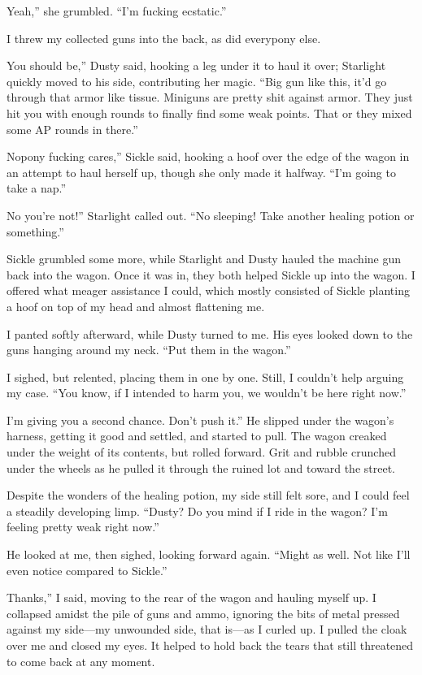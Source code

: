 \leavevmode{}Yeah,” she grumbled. “I’m fucking ecstatic.”

I threw my collected guns into the back, as did everypony else.

\leavevmode{}You should be,” Dusty said, hooking a leg under it to haul it over; Starlight quickly moved to his side, contributing her magic. “Big gun like this, it’d go through that armor like tissue. Miniguns are pretty shit against armor. They just hit you with enough rounds to finally find some weak points. That or they mixed some AP rounds in there.”

\leavevmode{}Nopony fucking cares,” Sickle said, hooking a hoof over the edge of the wagon in an attempt to haul herself up, though she only made it halfway. “I’m going to take a nap.”

\leavevmode{}No you’re not!” Starlight called out. “No sleeping! Take another healing potion or something.”

Sickle grumbled some more, while Starlight and Dusty hauled the machine gun back into the wagon. Once it was in, they both helped Sickle up into the wagon. I offered what meager assistance I could, which mostly consisted of Sickle planting a hoof on top of my head and almost flattening me.

I panted softly afterward, while Dusty turned to me. His eyes looked down to the guns hanging around my neck. “Put them in the wagon.”

I sighed, but relented, placing them in one by one. Still, I couldn’t help arguing my case. “You know, if I intended to harm you, we wouldn’t be here right now.”

\leavevmode{}I’m giving you a second chance. Don’t push it.” He slipped under the wagon’s harness, getting it good and settled, and started to pull. The wagon creaked under the weight of its contents, but rolled forward. Grit and rubble crunched under the wheels as he pulled it through the ruined lot and toward the street.

Despite the wonders of the healing potion, my side still felt sore, and I could feel a steadily developing limp. “Dusty? Do you mind if I ride in the wagon? I’m feeling pretty weak right now.”

He looked at me, then sighed, looking forward again. “Might as well. Not like I’ll even notice compared to Sickle.”

\leavevmode{}Thanks,” I said, moving to the rear of the wagon and hauling myself up. I collapsed amidst the pile of guns and ammo, ignoring the bits of metal pressed against my side—my unwounded side, that is—as I curled up. I pulled the cloak over me and closed my eyes. It helped to hold back the tears that still threatened to come back at any moment.

